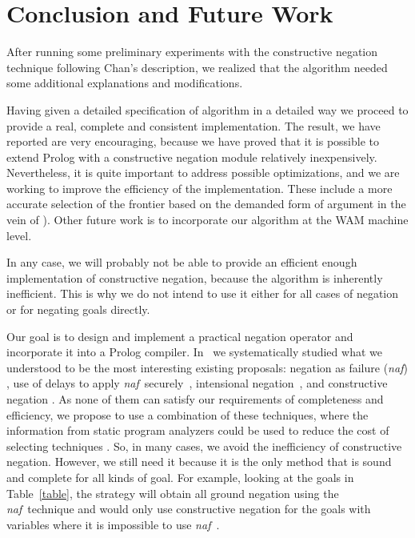 \documentclass{llncs}
\newcommand{\naf}{{\em naf}}\newcommand{\viejo}[1]{}
\begin{document}

\section{Conclusion and Future Work}
\label{conclusion}
After running some preliminary experiments with the constructive 
negation technique  following Chan's description, we realized that the
algorithm needed some additional explanations and modifications.

Having given a detailed specification of algorithm in a detailed way
we proceed to provide a real, complete and consistent
implementation. The result, we have reported are very encouraging,
because we have proved that it is possible to extend Prolog with a
constructive negation module relatively inexpensively. Nevertheless,
it is quite important to address possible optimizations, and we are
working to improve the efficiency of the implementation. These include
a more accurate selection of the frontier based on the demanded form
of argument in the vein of \cite{Moreno2}). Other future work is to
incorporate our algorithm at the WAM machine level.

In any case, we will probably not be able to provide an efficient enough
implementation of constructive negation, because the algorithm is
inherently inefficient.  This is why we do not intend to
use it either for all cases of negation or for negating goals
directly.

Our goal is to design and implement a practical negation operator and
incorporate it into a Prolog compiler.
In~\cite{SusanaPADL2000,SusanaLPAR01} we systematically studied what
we understood to be the most interesting existing proposals: negation
as failure (\naf) \cite{Clark}, use of delays to apply \naf\
securely~\cite{naish:lncs}, intensional
negation~\cite{Barbuti1,Barbuti2}, and constructive negation
\cite{Chan1,Chan2,Drabent,Stuckey,Stuckey95}. As none of them can
satisfy our requirements of completeness and efficiency, we propose to
use a combination of these techniques, where the information from
static program analyzers could be used to reduce the cost of selecting
techniques \cite{SusanaLPAR01}. So, in many cases, we avoid the
inefficiency of constructive negation. However, we still need it
because it is the only method that is sound and complete for all kinds
of goal. For example, looking at the goals in Table~\ref{table}, the
strategy will obtain all ground negation using the \naf\ technique and
would only use constructive negation for the goals with variables
where it is impossible to use \naf\ .
\end{document}
